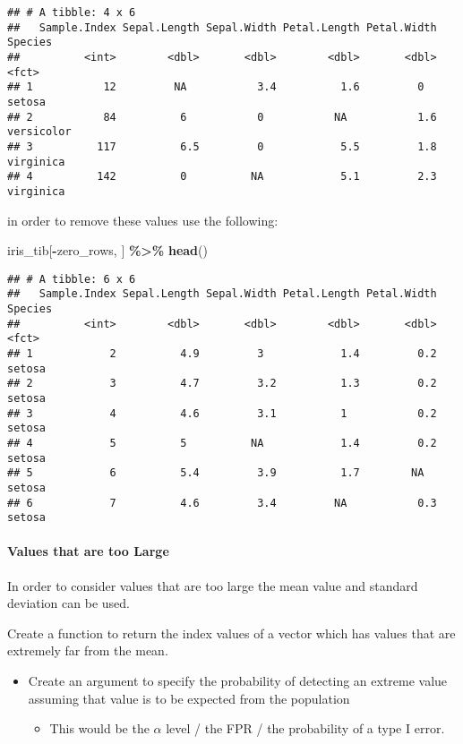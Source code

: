 \documentclass[
]{article}
\newenvironment{Shaded}{\begin{snugshade}}{\end{snugshade}}
\newcommand{\KeywordTok}[1]{\textcolor[rgb]{0.13,0.29,0.53}{\textbf{#1}}}
\newcommand{\NormalTok}[1]{#1}
\newcommand{\OperatorTok}[1]{\textcolor[rgb]{0.81,0.36,0.00}{\textbf{#1}}}
\newcommand{\StringTok}[1]{\textcolor[rgb]{0.31,0.60,0.02}{#1}}
\providecommand{\tightlist}{%
  \setlength{\itemsep}{0pt}\setlength{\parskip}{0pt}}
\begin{document}
\begin{verbatim}
## # A tibble: 4 x 6
##   Sample.Index Sepal.Length Sepal.Width Petal.Length Petal.Width Species   
##          <int>        <dbl>       <dbl>        <dbl>       <dbl> <fct>     
## 1           12         NA           3.4          1.6         0   setosa    
## 2           84          6           0           NA           1.6 versicolor
## 3          117          6.5         0            5.5         1.8 virginica 
## 4          142          0          NA            5.1         2.3 virginica
\end{verbatim}

in order to remove these values use the following:

\begin{Shaded}
\begin{Highlighting}[]
\NormalTok{iris\_tib[}\OperatorTok{{-}}\NormalTok{zero\_rows, ] }\OperatorTok{\%>\%}\StringTok{ }\KeywordTok{head}\NormalTok{()}
\end{Highlighting}
\end{Shaded}

\begin{verbatim}
## # A tibble: 6 x 6
##   Sample.Index Sepal.Length Sepal.Width Petal.Length Petal.Width Species
##          <int>        <dbl>       <dbl>        <dbl>       <dbl> <fct>  
## 1            2          4.9         3            1.4         0.2 setosa 
## 2            3          4.7         3.2          1.3         0.2 setosa 
## 3            4          4.6         3.1          1           0.2 setosa 
## 4            5          5          NA            1.4         0.2 setosa 
## 5            6          5.4         3.9          1.7        NA   setosa 
## 6            7          4.6         3.4         NA           0.3 setosa
\end{verbatim}

\hypertarget{values-that-are-too-large}{%
\paragraph{Values that are too Large}\label{values-that-are-too-large}}

In order to consider values that are too large the mean value and
standard deviation can be used.

Create a function to return the index values of a vector which has
values that are extremely far from the mean.

\begin{itemize}
\tightlist
\item
  Create an argument to specify the probability of detecting an extreme
  value assuming that value is to be expected from the population

  \begin{itemize}
  \tightlist
  \item
    This would be the \(\alpha\) level / the FPR / the probability of a
    type I error.
  \end{itemize}
\end{itemize}
\end{document}

